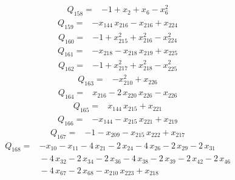 \documentclass[11pt]{article}
\theoremstyle{definition}\newtheorem{definition}[theorem]{Definition}
\begin{document}
\begin{align*}
Q_{158}={}&-1+x_{2}+x_{6}-x_{6}^{2}
\end{align*}
\begin{align*}
Q_{159}={}&-x_{144}\,x_{216}-x_{216}+x_{224}
\end{align*}
\begin{align*}
Q_{160}={}&-1+x_{215}^{2}+x_{216}^{2}-x_{224}^{2}
\end{align*}
\begin{align*}
Q_{161}={}&-x_{218}-x_{218}\,x_{219}+x_{225}
\end{align*}
\begin{align*}
Q_{162}={}&-1+x_{217}^{2}+x_{218}^{2}-x_{225}^{2}
\end{align*}
\begin{align*}
Q_{163}={}&-x_{210}^{2}+x_{226}
\end{align*}
\begin{align*}
Q_{164}={}&x_{216}-2\,x_{220}\,x_{226}-x_{226}
\end{align*}
\begin{align*}
Q_{165}={}&x_{144}\,x_{215}+x_{221}
\end{align*}
\begin{align*}
Q_{166}={}&-x_{144}-x_{215}\,x_{221}+x_{219}
\end{align*}
\begin{align*}
Q_{167}={}&-1-x_{209}-x_{215}\,x_{222}+x_{217}
\end{align*}
\begin{align*}
Q_{168}={}&-x_{10}-x_{11}-4\,x_{21}-2\,x_{24}-4\,x_{26}-2\,x_{29}-2\,x_{31}
\\ &{}-4\,x_{32}-2\,x_{34}-2\,x_{36}-4\,x_{38}-2\,x_{39}-2\,x_{42}-2\,x_{46}
\\ &{}-4\,x_{67}-2\,x_{68}-x_{210}\,x_{223}+x_{218}
\end{align*}
\end{document}
